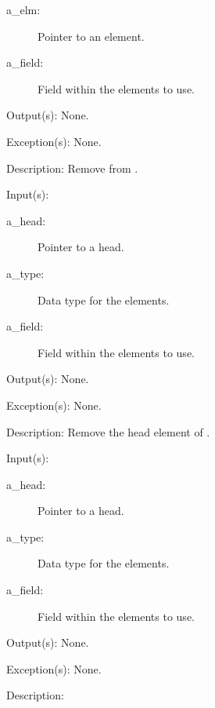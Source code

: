 \begin{capi}
\begin{capilist}
\begin{description}
		\item[a\_elm: ]
			Pointer to an element.
		\item[a\_field: ]
			Field within the  elements to use.
		\end{description}
	\item[Output(s): ] None.
	\item[Exception(s): ] None.
	\item[Description: ]
		Remove  from .
	\end{capilist}
\label{ql_head_remove}
	\begin{capilist}
	\item[Input(s): ]
		\begin{description}\item[]
		\item[a\_head: ]
			Pointer to a  head.
		\item[a\_type: ]
			Data type for the  elements.
		\item[a\_field: ]
			Field within the  elements to use.
		\end{description}
	\item[Output(s): ] None.
	\item[Exception(s): ] None.
	\item[Description: ]
		Remove the head element of .
	\end{capilist}
\label{ql_tail_remove}
	\begin{capilist}
	\item[Input(s): ]
		\begin{description}\item[]
		\item[a\_head: ]
			Pointer to a \classname{ql} head.
		\item[a\_type: ]
			Data type for the  elements.
		\item[a\_field: ]
			Field within the  elements to use.
		\end{description}
	\item[Output(s): ] None.
	\item[Exception(s): ] None.
	\item[Description: ]

\end{capilist}
\end{capi}
